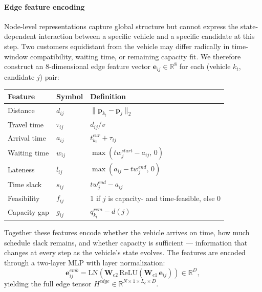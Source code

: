 \paragraph{Edge feature encoding}
Node-level representations capture global structure but cannot express the state-dependent interaction between a specific vehicle and a specific candidate at this step.
Two customers equidistant from the vehicle may differ radically in time-window compatibility, waiting time, or remaining capacity fit.
We therefore construct an 8-dimensional edge feature vector $\mathbf{e}_{ij} \in \mathbb{R}^8$ for each (vehicle $k_t$, candidate $j$) pair:

\medskip
\begin{center}
\begin{tabular}{@{} l l p{1.65in} @{}}
\toprule
Feature & Symbol & Definition \\
\midrule
Distance       & $d_{ij}$    & $\|\mathbf{p}_{k_t} - \mathbf{p}_j\|_2$ \\
Travel time    & $\tau_{ij}$ & $d_{ij} / v$ \\
Arrival time   & $a_{ij}$    & $t^{cur}_{k_t} + \tau_{ij}$ \\
Waiting time   & $w_{ij}$    & $\max(tw^{start}_j - a_{ij},\,0)$ \\
Lateness       & $l_{ij}$    & $\max(a_{ij} - tw^{end}_j,\,0)$ \\
Time slack     & $s_{ij}$    & $tw^{end}_j - a_{ij}$ \\
Feasibility    & $f_{ij}$    & 1 if $j$ is capacity- and time-feasible, else 0 \\
Capacity gap   & $g_{ij}$    & $q^{rem}_{k_t} - d(j)$ \\
\bottomrule
\end{tabular}
\end{center}
\medskip

Together these features encode whether the vehicle arrives on time, how much schedule slack remains, and whether capacity is sufficient --- information that changes at every step as the vehicle's state evolves.
The features are encoded through a two-layer MLP with layer normalization:
\[
\mathbf{e}_{ij}^{emb} = \mathrm{LN}\!\left(\mathbf{W}_{e2}\,\mathrm{ReLU}\!\left(\mathbf{W}_{e1}\,\mathbf{e}_{ij}\right)\right) \in \mathbb{R}^D,
\]
yielding the full edge tensor $H^{edge} \in \mathbb{R}^{N \times 1 \times L_c \times D}$.

